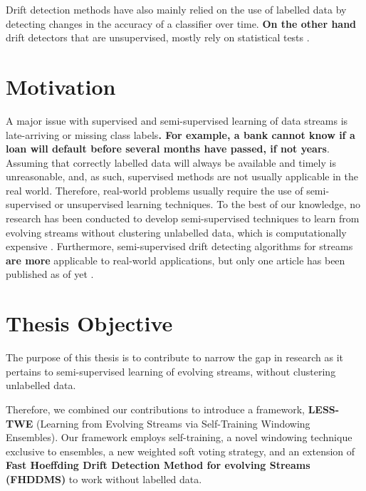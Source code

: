 Drift detection methods have also mainly relied on the use of labelled data by detecting changes in the accuracy of a classifier over time. \textbf{On the other hand} drift detectors that are unsupervised, mostly rely on statistical tests \cite{dries2009adaptive, friedman1979multivariate, sheskin2003handbook, sobolewski2013concept}.



\section{Motivation}
A major issue with supervised and semi-supervised learning of data streams is late-arriving or missing class labels\textbf{. For example, a bank cannot know if a loan will default before several months have passed, if not years}. Assuming that correctly labelled data will always be available and timely is unreasonable, and, as such, supervised methods are not usually applicable in the real world. Therefore, real-world problems usually require the use of semi-supervised or unsupervised learning techniques. To the best of our knowledge, no research has been conducted to develop semi-supervised techniques to learn from evolving streams without clustering unlabelled data, which is computationally expensive \cite{krempl2014open}. Furthermore, semi-supervised drift detecting algorithms for streams \textbf{are more} applicable to real-world applications, but only one article has been published as of yet \cite{haque2015sand}.

\section{Thesis Objective}
The purpose of this thesis is to contribute to narrow the gap in research as it pertains to semi-supervised learning of evolving streams, without clustering unlabelled data.

Therefore, we combined our contributions to introduce a framework, \textbf{LESS-TWE} (Learning from Evolving Streams via Self-Training Windowing Ensembles). Our framework employs self-training, a novel windowing technique exclusive to ensembles, a new weighted soft voting strategy, and an extension of \textbf{Fast Hoeffding Drift Detection Method for evolving Streams (FHDDMS)} to work without labelled data.

